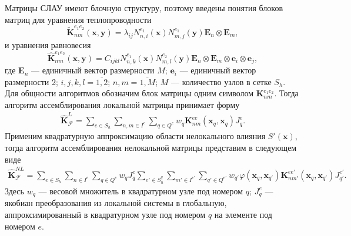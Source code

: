 Матрицы СЛАУ имеют блочную структуру, поэтому введены понятия блоков матриц для уравнения теплопроводности
\[
	\widetilde{\textbf{K}}_{nm}^{e_1 e_2} (\boldsymbol{x}, \boldsymbol{y}) =
	\lambda_{ij} N_{n,i}^{e_1} (\boldsymbol{x}) N_{m,j}^{e_1} (\boldsymbol{y})
	\boldsymbol{E}_n \otimes \boldsymbol{E}_m,
\]
и уравнения равновесия
\[
	\widehat{\textbf{K}}_{nm}^{e_1 e_2} (\boldsymbol{x}, \boldsymbol{y}) = 
	C_{ijkl} N_{n,k}^{e_1} (\boldsymbol{x}) N_{m,l}^{e_2} (\boldsymbol{y}) \boldsymbol{E}_n \otimes \boldsymbol{E}_m \otimes \boldsymbol{e}_i \otimes \boldsymbol{e}_j,
\]
где $\boldsymbol{E}_n$ --- единичный вектор размерности $M$; $\boldsymbol{e}_i$ --- единичный вектор размерности 2; $i,j,k,l = \overline{1,2}$; $n,m = \overline{1,M}$; $M$ --- количество узлов в сетке $S_h$. Для общности алгоритмов обозначим блок матрицы одним символом $\textbf{K}_{nm}^{e_1 e_2}$. Тогда алгоритм ассемблирования локальной матрицы принимает форму
\begin{gather}
	\label{eq:localMatrix}
	\widehat{\textbf{K}}^L_{\mathcal{F}} =
	\sum\limits_{e \in S_h}
	\sum\limits_{n,m \in I^e}
	\sum\limits_{q \in Q^e}
	w_q \textbf{K}^{ee}_{nm} (\boldsymbol{x}_q, \boldsymbol{x}_q) J_q^e.
\end{gather}
Применим квадратурную аппроксимацию области нелокального влияния $S'(\boldsymbol{x})$, тогда алгоритм ассемблирования нелокальной матрицы представим в следующем виде
\begin{gather}
	\label{eq:NonlocalMatrix}
	\widehat{\textbf{K}}^{NL}_{\mathcal{F}} =
	\sum\limits_{e \in S_h}
	\sum\limits_{n \in I^e}
	\sum\limits_{q \in Q^e}
	w_q J_q^e
	\sum\limits_{e' \in S_h^q}
	\sum\limits_{m' \in I^{e'}}
	\sum\limits_{q' \in Q^{e'}}
	w_{q'} \varphi(\boldsymbol{x}_q, \boldsymbol{x}_{q'}) 
	\textbf{K}_{nm'}^{e e'}(\boldsymbol{x}_q, \boldsymbol{x}_{q'}) J_{q'}^{e'}.
\end{gather}
Здесь $w_q$ --- весовой множитель в квадратурном узле под номером $q$; $J_q^e$ --- якобиан преобразования из локальной системы в глобальную, аппроксимированный в квадратурном узле под номером $q$ на элементе под номером $e$.

